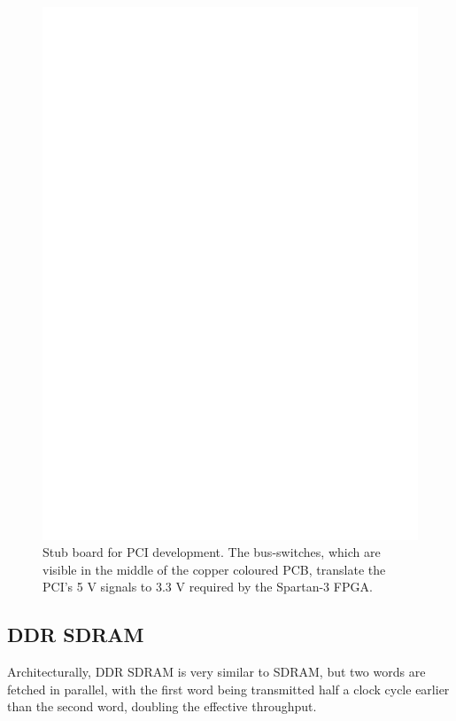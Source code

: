 \begin{figure}[h!]
\begin{center}
\includegraphics[width=\linewidth]{images/pci_stub.eps}
\caption[Stub board for PCI development]{Stub board for PCI development. The
bus-switches, which are visible in the middle of the copper coloured PCB,
translate the PCI's 5 V signals to 3.3 V required by the Spartan-3 FPGA.}
\end{center}
\end{figure}


\subsection{DDR SDRAM}
Architecturally, DDR SDRAM is very similar to SDRAM\cite{inc:mxx}, but two words
are fetched in parallel, with the first word being transmitted half a clock cycle
earlier than the second word, doubling the effective throughput.

